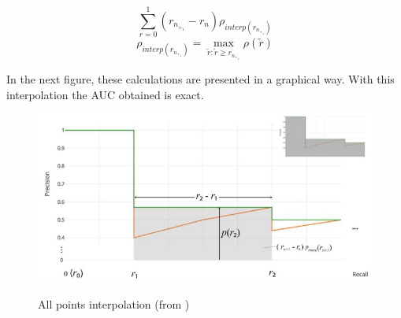 \begin{itemize}
\begin{itemize}
        \begin{center}
        \begin{equation}\label{all_1}
            \sum_{r=0}^{1}(r_n_+_1 - r_n)\rho_{interp(r_n_+_1)}
        \end{equation}
        \begin{equation}\label{all_2}
            \rho_{interp(r_n_+_1)}=\max_{\tilde{r}:\tilde{r}\geq r_n_+_1}{\rho(\tilde{r})}
        \end{equation}
        \end{center}
        In the next figure, these calculations are presented in a graphical way. With this interpolation the AUC obtained is exact.
        \begin{figure}[H]
        \begin{center}
            \centering
            \includegraphics[scale=0.4]{figures/ap_all.jpeg}
            \label{fig:all_ap}
            \caption{All points interpolation (from \cite{all_ap_fig})}
        \end{center}
        \end{figure}
        
    \end{itemize}
\end{itemize}


